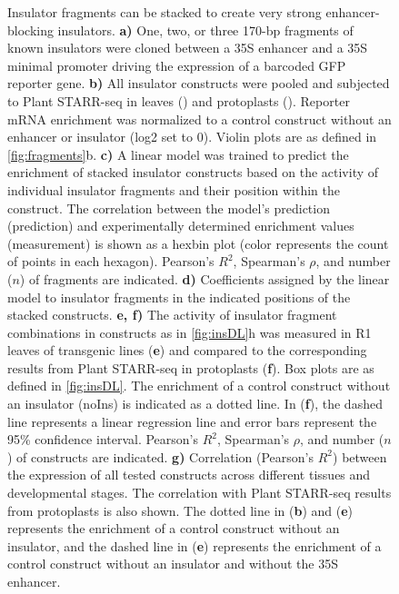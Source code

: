 \documentclass[10pt]{article}
\newcommand{\fignormal}{\scriptsize} %
\newcommand{\usename}[1]{\csname#1\endcsname}
\newif\ifnpc
\newcounter{fig}
\newenvironment{fig}{%
	\begin{figure}[p]%
		\stepcounter{fig}%
		\pdfbookmark{\figurename\ \thefig}{figure\thefig}
		\tikzsetnextfilename{figure\thefig}%
		\fignormal%
		\centering%
}{%
	\end{figure}%
	\clearpage%
	\ifnpc%
		\makenextpagecaption%
		\global\npcfalse%
	\fi%
}
\newcommand{\titleend}{ }
\newcommand{\nextentry}{ }
\newcommand{\captiontitle}[2][]{#2.\titleend}
\newif\ifsubfigupper
\newcounter{subfig}[figure]
\newcommand{\subfigrefsep}{ }
\newcommand{\subfigrefand}{, }
\newcommand{\subfigunformatted}[1]{\ifsubfigupper\uppercase{#1}\else\lowercase{#1}\fi}
\newcommand{\plainsubfigref}[1]{\textbf{\subfigunformatted{#1}}}
\newcommand{\subfig}[1]{\textbf{\plainsubfigref{#1})}\subfigrefsep}
\newcommand{\subfigtwo}[2]{\textbf{\plainsubfigref{#1}\subfigrefand\plainsubfigref{#2})}\subfigrefsep}
\newcommand{\parensubfig}[2][]{(#1\plainsubfigref{#2})}
\begin{document}
		\begin{fig}
			\caption{%
				\captiontitle{Insulator fragments can be stacked to create very strong enhancer-blocking insulators}%
				\subfig{A} One, two, or three 170-bp fragments of known insulators were cloned between a \usename{35S} enhancer and a 35S minimal promoter driving the expression of a barcoded GFP reporter gene.\nextentry
				\subfig{B} All insulator constructs were pooled and subjected to Plant STARR-seq in \tobacco leaves (\tobacco) and \maize protoplasts (\maize). Reporter mRNA enrichment was normalized to a control construct without an enhancer or insulator (log2 set to 0). Violin plots are as defined in \cref{fig:fragments}\subfigunformatted{B}.\nextentry
				\subfig{C} A linear model was trained to predict the enrichment of stacked insulator constructs based on the activity of individual insulator fragments and their position within the construct. The correlation between the model's prediction (prediction) and experimentally determined enrichment values (measurement) is shown as a hexbin plot (color represents the count of points in each hexagon). Pearson's $R^2$, Spearman's $\rho$, and number ($n$) of fragments are indicated.\nextentry
				\subfig{D} Coefficients assigned by the linear model to insulator fragments in the indicated positions of the stacked constructs.\nextentry
				\subfigtwo{E}{F} The activity of insulator fragment combinations in constructs as in \cref{fig:insDL}\subfigunformatted{h} was measured in R1 leaves of transgenic \maize lines \parensubfig{E} and compared to the corresponding results from Plant STARR-seq in \maize protoplasts \parensubfig{F}. Box plots are as defined in \cref{fig:insDL}. The enrichment of a control construct without an insulator (noIns) is indicated as a dotted line. In \parensubfig{F}, the dashed line represents a linear regression line and error bars represent the 95\% confidence interval. Pearson's $R^2$, Spearman's $\rho$, and number ($n$) of constructs are indicated.\nextentry
				\subfig{G} Correlation (Pearson's $R^2$) between the expression of all tested constructs across different tissues and developmental stages. The correlation with Plant STARR-seq results from \maize protoplasts is also shown.
				The dotted line in \parensubfig{B} and \parensubfig{E} represents the enrichment of a control construct without an insulator, and the dashed line in \parensubfig{E} represents the enrichment of a control construct without an insulator and without the 35S enhancer.
			}%
			\label{fig:stacking}%
		\end{fig}
		
\end{document}
